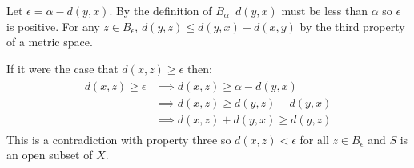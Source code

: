 \documentclass[paper=a4, fontsize=11pt]{jhwhw} %
\begin{document}
Let $\epsilon = \alpha - d(y, x)$. By the definition of $B_\alpha$\, $d(y, x)$ must be less than $\alpha$ so $\epsilon$ is positive. For any $z\in B_\epsilon$, $d(y, z) \le d(y, x) + d(x, y)$ by the third property of a metric space.

If it were the case that $d(x, z) \ge \epsilon$ then:
\begin{align}
    \begin{split}
        d(x, z) \ge \epsilon &\implies d(x, z) \ge \alpha - d(y, x)\\
                             &\implies d(x, z) \ge d(y, z) - d(y, x)\\
                             &\implies d(x, z) + d(y, x) \ge d(y, z)
    \end{split}
\end{align}
This is a contradiction with property three so $d(x, z) < \epsilon$ for all $z\in B_\epsilon$ and $S$ is an open subset of $X$.
\end{document}
